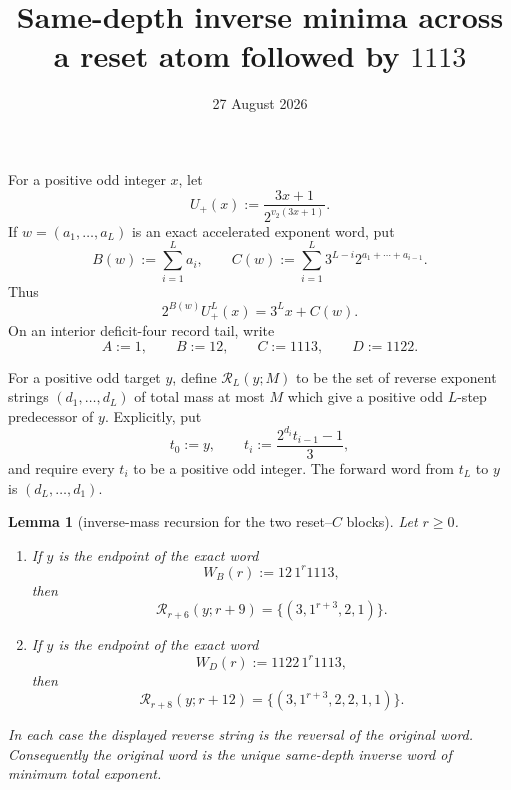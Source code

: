 \documentclass[11pt]{article}
\title{Same-depth inverse minima across a reset atom followed by $1113$}
\author{}
\date{27 August 2026}
\newtheorem{lemma}[theorem]{Lemma}
\newcommand{\Up}{U_+}
\begin{document}
\maketitle

For a positive odd integer $x$, let
\[
 \Up(x):=\frac{3x+1}{2^{v_2(3x+1)}}.
 \tag{1}
\]
If $w=(a_1,\ldots,a_L)$ is an exact accelerated exponent word, put
\[
 B(w):=\sum_{i=1}^L a_i,
 \qquad
 C(w):=\sum_{i=1}^L3^{L-i}2^{a_1+\cdots+a_{i-1}}.
 \tag{2}
\]
Thus
\[
 2^{B(w)}\Up^L(x)=3^Lx+C(w).
 \tag{3}
\]
On an interior deficit-four record tail, write
\[
 A:=1,\qquad B:=12,\qquad C:=1113,\qquad D:=1122.
 \tag{4}
\]

For a positive odd target $y$, define $\mathcal R_L(y;M)$ to be the set
of reverse exponent strings $(d_1,\ldots,d_L)$ of total mass at most $M$
which give a positive odd $L$-step predecessor of $y$.  Explicitly, put
\[
 t_0:=y,
 \qquad
 t_i:=\frac{2^{d_i}t_{i-1}-1}{3},
 \tag{5}
\]
and require every $t_i$ to be a positive odd integer.  The forward word
from $t_L$ to $y$ is $(d_L,\ldots,d_1)$.

\begin{lemma}[inverse-mass recursion for the two reset--$C$ blocks]
Let $r\geq0$.
\begin{enumerate}
 \item If $y$ is the endpoint of the exact word
 \[
  W_B(r):=12\,1^r1113,
  \tag{6}
 \]
 then
 \[
  \boxed{
  \mathcal R_{r+6}(y;r+9)
  =\{(3,1^{r+3},2,1)\}.}
  \tag{7}
 \]
 \item If $y$ is the endpoint of the exact word
 \[
  W_D(r):=1122\,1^r1113,
  \tag{8}
 \]
 then
 \[
  \boxed{
  \mathcal R_{r+8}(y;r+12)
  =\{(3,1^{r+3},2,2,1,1)\}.}
  \tag{9}
 \]
\end{enumerate}
In each case the displayed reverse string is the reversal of the original
word.  Consequently the original word is the unique same-depth inverse
word of minimum total exponent.
\end{lemma}
\end{document}
